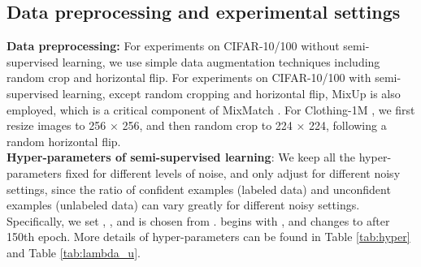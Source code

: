 \documentclass[11pt]{article}
\begin{document}
\subsection{Data preprocessing and experimental settings}
\textbf{Data preprocessing:} For experiments on CIFAR-10/100 \cite{krizhevsky2009CIFAR} without semi-supervised learning, we use simple data augmentation techniques including random crop and horizontal flip. For experiments on CIFAR-10/100 with semi-supervised learning, except random cropping and horizontal flip, MixUp \cite{Zhang2017MixUp} is also employed, which is a critical component of MixMatch \cite{Berthelot2019MixMatch}. For Clothing-1M \cite{Xiao2015Clothing}, we first resize images to 256 × 256, and then random crop to 224 × 224, following a random horizontal flip. \\

\noindent \textbf{Hyper-parameters of semi-supervised learning}: We keep all the hyper-parameters fixed for different levels of noise, and only adjust  for different noisy settings, since the ratio of confident examples (labeled data) and unconfident examples (unlabeled data) can vary greatly for different noisy settings. Specifically, we set , , and  is chosen from .  begins with , and changes to  after 150th epoch. More details of hyper-parameters can be found in Table \ref{tab:hyper} and Table \ref{tab:lambda_u}. 
\end{document}
